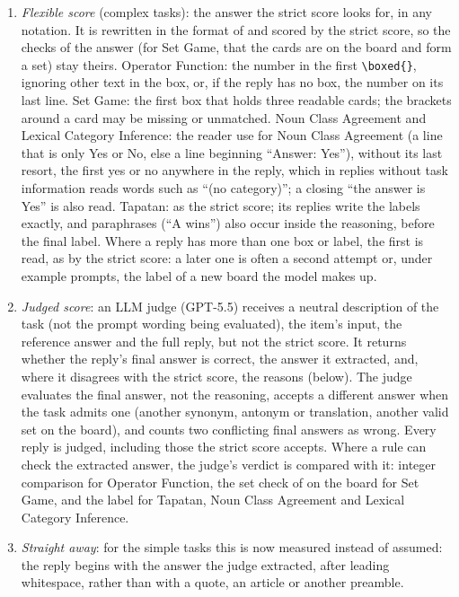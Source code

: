 \documentclass[11pt,a4paper]{article}
\begin{document}
\begin{enumerate}
\item \emph{Flexible score} (complex tasks): the answer the strict score looks for, in any notation. It is rewritten in the format of \citet{fu2026rules} and scored by the strict score, so the checks of the answer (for Set Game, that the cards are on the board and form a set) stay theirs. Operator Function: the number in the first \texttt{\textbackslash boxed\{\}}, ignoring other text in the box, or, if the reply has no box, the number on its last line. Set Game: the first box that holds three readable cards; the brackets around a card may be missing or unmatched. Noun Class Agreement and Lexical Category Inference: the reader \citet{fu2026rules} use for Noun Class Agreement (a line that is only Yes or No, else a line beginning ``Answer: Yes''), without its last resort, the first yes or no anywhere in the reply, which in replies without task information reads words such as ``(no category)''; a closing ``the answer is Yes'' is also read. Tapatan: as the strict score; its replies write the labels exactly, and paraphrases (``A wins'') also occur inside the reasoning, before the final label. Where a reply has more than one box or label, the first is read, as by the strict score: a later one is often a second attempt or, under example prompts, the label of a new board the model makes up.
\item \emph{Judged score}: an LLM judge (GPT-5.5) receives a neutral description of the task (not the prompt wording being evaluated), the item's input, the reference answer and the full reply, but not the strict score. It returns whether the reply's final answer is correct, the answer it extracted, and, where it disagrees with the strict score, the reasons (below). The judge evaluates the final answer, not the reasoning, accepts a different answer when the task admits one (another synonym, antonym or translation, another valid set on the board), and counts two conflicting final answers as wrong. Every reply is judged, including those the strict score accepts. Where a rule can check the extracted answer, the judge's verdict is compared with it: integer comparison for Operator Function, the set check of \citet{fu2026rules} on the board for Set Game, and the label for Tapatan, Noun Class Agreement and Lexical Category Inference.
\item \emph{Straight away}: for the simple tasks this is now measured instead of assumed: the reply begins with the answer the judge extracted, after leading whitespace, rather than with a quote, an article or another preamble.
\end{enumerate}
\end{document}
